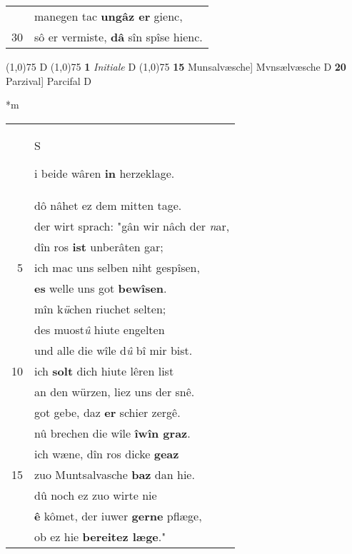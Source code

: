 \documentclass[8pt,a4paper,notitlepage]{article}
\begin{document}
\begin{table}[ht]
\begin{minipage}[t]{0.5\linewidth}
\begin{tabular}{rl}
 & manegen tac \textbf{ungâz er} gienc,\\ 
30 & sô er vermiste, \textbf{dâ} sîn spîse hienc.\\ 
\end{tabular}
\scriptsize
\line(1,0){75} \newline
D \newline
\line(1,0){75} \newline
\textbf{1} \textit{Initiale} D  \newline
\line(1,0){75} \newline
\textbf{15} Munsalvæsche] Mvnsælvæsche D \textbf{20} Parzival] Parcifal D \newline
\end{minipage}
\hspace{0.5cm}
\begin{minipage}[t]{0.5\linewidth}
\small
\begin{center}*m
\end{center}
\begin{tabular}{rl}
 & \begin{large}S\end{large}i beide wâren \textbf{in} herzeklage.\\ 
 & dô nâhet ez dem mitten tage.\\ 
 & der wirt sprach: "gân wir nâch der \textit{n}ar,\\ 
 & dîn ros \textbf{ist} unberâten gar;\\ 
5 & ich mac uns selben niht gespîsen,\\ 
 & \textbf{es} welle uns got \textbf{bewîsen}.\\ 
 & mîn k\textit{ü}chen riuchet selten;\\ 
 & des muost\textit{û} hiute engelten\\ 
 & und alle die wîle d\textit{û} bî mir bist.\\ 
10 & ich \textbf{solt} dich hiute lêren list\\ 
 & an den würzen, liez uns der snê.\\ 
 & got gebe, daz \textbf{er} schier zergê.\\ 
 & nû brechen die wîle \textbf{îwîn graz}.\\ 
 & ich wæne, dîn ros dicke \textbf{geaz}\\ 
15 & zuo Muntsalvasche \textbf{baz} dan hie.\\ 
 & dû noch ez zuo wirte nie\\ 
 & \textbf{ê} kômet, der iuwer \textbf{gerne} pflæge,\\ 
 & ob ez hie \textbf{bereitez læge}."\\ 

\end{tabular}
\end{minipage}
\end{table}
\end{document}
